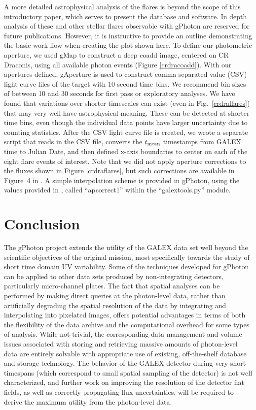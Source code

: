 \documentclass[preprint]{aastex}
\begin{document}
A more detailed astrophysical analysis of the flares is beyond the scope of this introductory paper, which serves to present the database and software. In depth analysis of these and other stellar flares observable with gPhoton are reserved for future publications. However, it is instructive to provide an outline demonstrating the basic work flow when creating the plot shown here. To define our photometric aperture, we used gMap to construct a deep coadd image, centered on CR Draconis, using all available photon events (Figure \ref{crdracoadd}). With our apertures defined, gAperture is used to construct comma separated value (CSV) light curve files of the target with 10 second time bins. We recommend bin sizes of between 10 and 30 seconds for first pass or exploratory analyses. We have found that variations over shorter timescales can exist (even in Fig.\ \ref{crdraflares}) that may very well have astrophysical meaning. These can be detected at shorter time bins, even though the individual data points have larger uncertainty due to counting statistics. After the CSV light curve file is created, we wrote a separate script that reads in the CSV file, converts the $t_{\rm{mean}}$ timestamps from GALEX time to Julian Date, and then defined x-axis boundaries to center on each of the eight flare events of interest. Note that we did not apply aperture corrections to the fluxes shown in Figure \ref{crdraflares}, but such corrections are available in Figure\ 4 in \citet{mor2007}. A simple interpolation scheme is provided in gPhoton, using the values provided in \cite{mor2007}, called ``apcorrect1'' within the ``galextools.py'' module.

\section{Conclusion}
The gPhoton project extends the utility of the GALEX data set well beyond the scientific objectives of the original mission, most specifically towards the study of short time domain UV variability. Some of the techniques developed for gPhoton can be applied to other data sets produced by non-integrating detectors, particularly micro-channel plates. The fact that spatial analyses can be performed by making direct queries at the photon-level data, rather than artificially degrading the spatial resolution of the data by integrating and interpolating into pixelated images, offers potential advantages in terms of both the flexibility of the data archive and the computational overhead for some types of analysis. While not trivial, the corresponding data management and volume issues associated with storing and retrieving massive amounts of photon-level data are entirely solvable with appropriate use of existing, off-the-shelf database and storage technology. The behavior of the GALEX detector during very short timespans (which correspond to small spatial sampling of the detector) is not well characterized, and further work on improving the resolution of the detector flat fields, as well as correctly propagating flux uncertainties, will be required to derive the maximum utility from the photon-level data.
\end{document}
